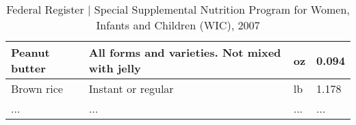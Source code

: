 \begin{itemize}
\begin{table*}[!ht]
\begin{tabular}{ |l|p{8cm}|l|p{4cm}|  }
			Peanut butter& 	All forms and varieties. Not mixed with jelly& 	oz& 	0.094\\\hline
			Brown rice& 	Instant or regular& 	lb& 	1.178\\\hline
			...& 	...& 	...& 	...\\
			\hline
			
		\end{tabular}
		\vspace{.2cm}
		\caption{Federal Register | Special Supplemental Nutrition Program for Women, Infants and Children (WIC), 2007\label{tab:q1-result2}}
	\end{table*}
	
	
\end{itemize}
